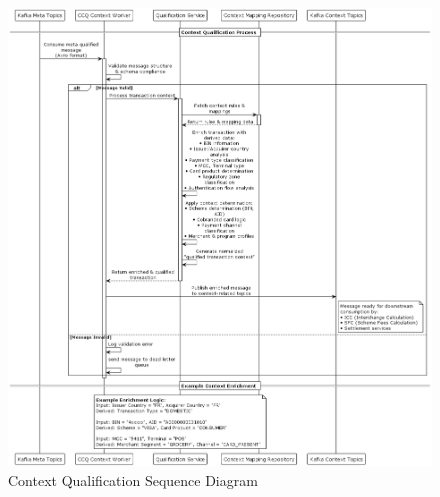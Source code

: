\begin{figure}[H]
    \centering
    \includegraphics[width=1.05\textwidth]{out/diagrams/plantuml/in/context-sequence-diagram/P2S Context Qualification Process.png}
    \caption{Context Qualification Sequence Diagram}
    \label{fig:context_qualification_sequence}
\end{figure}   


